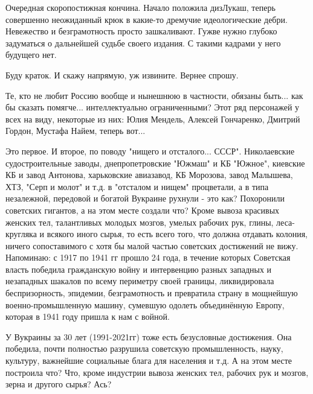 \begin{itemize}
Очередная скоропостижная кончина. Начало положила дизЛукаш, теперь совершенно
неожиданный крюк в какие-то дремучие идеологические дебри. Невежество и
безграмотность просто зашкаливают. Гужве нужно глубоко задуматься о дальнейшей
судьбе своего издания. С такими кадрами у него будущего нет.

 

Буду краток. И скажу напрямую, уж извините. Вернее спрошу.

Те, кто не любит Россию вообще и нынешнюю в частности, обязаны быть... как бы
сказать помягче... интеллектуально ограниченными? Этот ряд персонажей у всех на
виду, некоторые из них: Юлия Мендель, Алексей Гончаренко, Дмитрий Гордон,
Мустафа Найем, теперь вот...

Это первое. И второе, по поводу "нищего и отсталого... СССР". Николаевские
судостроительные заводы, днепропетровские "Южмаш" и КБ "Южное", киевские КБ и
завод Антонова, харьковские авиазавод, КБ Морозова, завод Малышева, ХТЗ, "Серп
и молот" и т.д. в "отсталом и нищем" процветали, а в типа незалежной, передовой
и богатой Вукраине рухнули - это как? Похоронили советских гигантов, а на этом
месте создали что? Кроме вывоза красивых женских тел, талантливых молодых
мозгов, умелых рабочих рук, глины, леса-кругляка и всякого иного сырья, то есть
всего того, что должна отдавать колония, ничего сопоставимого с хотя бы малой
частью советских достижений не вижу. Напоминаю: с 1917 по 1941 гг прошло 24
года, в течение которых Советская власть победила гражданскую войну и
интервенцию разных западных и незападных шакалов по всему периметру своей
границы, ликвидировала беспризорность, эпидемии, безграмотность и превратила
страну в мощнейшую военно-промышленную машину, сумевшую одолеть объединённую
Европу, которая в 1941 году пришла к нам с войной.

У Вукраины за 30 лет (1991-2021гг) тоже есть безусловные достижения. Она
победила, почти полностью разрушила советскую промышленность, науку, культуру,
важнейшие социальные блага для населения и т.д. А на этом месте построила что?
Что, кроме индустрии вывоза женских тел, рабочих рук и мозгов, зерна и другого
сырья? Ась?

\begin{itemize}
 

\end{itemize}
\end{itemize}
